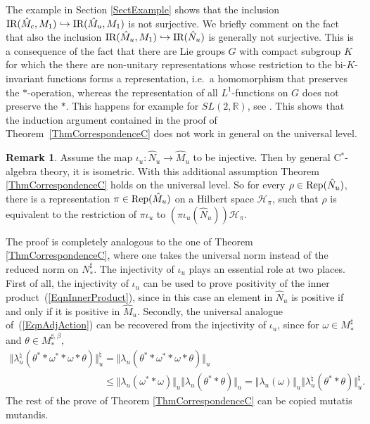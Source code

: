 \documentclass[pdftex]{sigma}
\numberwithin{equation}{section}
\theoremstyle{definition}
\newtheorem{rmk}[thm]{Remark}
\newcommand{\Rep}{\text{\rm Rep}}
\newcommand{\cHil}{\mathcal{H}}
\newcommand{\IR}{\text{\rm IR}}
\begin{document}
The example in Section \ref{SectExample} shows that the inclusion $\IR(\hat{M}_c, M_1) \hookrightarrow \IR(\hat{M}_u, M_1)$ is not surjective. We brief\/ly comment on the fact that also the inclusion $\IR(\hat{M}_u, M_1) \hookrightarrow \IR(\hat{N}_u)$ is generally not surjective. This is a consequence of the fact that there are Lie groups $G$ with compact subgroup $K$ for which the there are non-unitary representations whose restriction to the bi-$K$-invariant functions forms a representation, i.e.\ a homomorphism that preserves the $\ast$-operation, whereas the representation of all $L^1$-functions on $G$ does not preserve the $\ast$. This happens for example for $SL(2, \mathbb{R})$, see \cite[Example~1.1.2 on p.~37 and p.~40]{Vog}.
 This shows that the induction argument contained in the proof of Theorem~\ref{ThmCorrespondenceC} does not work in general on the universal level.

\begin{rmk}\label{RmkIotaUIsNotInjective}
Assume the map $\iota_u: \hat{N}_u \rightarrow \hat{M}_u$ to be injective. Then by general C$^\ast$-algebra theory, it is isometric. With this additional assumption Theorem \ref{ThmCorrespondenceC} holds on the universal level. So for every $\rho \in \Rep(\hat{N}_u)$, there is a representation $\pi \in \Rep(\hat{M}_u)$ on a Hilbert space $\cHil_\pi$, such that $\rho$ is equivalent to the restriction of $\pi \iota_u$ to $(\pi \iota_u(\hat{N}_u))\cHil_\pi$.

The proof is completely analogous to the one of Theorem \ref{ThmCorrespondenceC}, where one takes the universal norm instead of the reduced norm on $N_\ast^\sharp$. The injectivity of $\iota_u$ plays an essential role at two places. First of all, the injectivity of $\iota_u$ can be used to prove positivity of the inner product~(\ref{EqnInnerProduct}), since in this case an element in $\hat{N}_u$ is positive if and only if it is positive in $\hat{M}_u$. Secondly, the universal analogue of~(\ref{EqnAdjAction}) can be recovered from the injectivity of $\iota_u$, since for $\omega \in M_\ast^\sharp$ and $\theta \in M_\ast^{\sharp, \beta}$,
\begin{gather*}
 \Vert \lambda_u^\natural (\theta^\ast \ast \omega^\ast \ast \omega \ast \theta) \Vert_u^\natural
 = \Vert \lambda_u (\theta^\ast \ast \omega^\ast \ast \omega \ast \theta) \Vert_u \\
\phantom{\Vert \lambda_u^\natural (\theta^\ast \ast \omega^\ast \ast \omega \ast \theta) \Vert_u^\natural}{}
 \leq   \Vert  \lambda_u(\omega^\ast \ast \omega) \Vert_u  \Vert \lambda_u (\theta^\ast  \ast \theta) \Vert_u
  = \Vert \lambda_u(\omega) \Vert_u \Vert \lambda_u^\natural (\theta^\ast  \ast \theta) \Vert_u^\natural.
\end{gather*}
The rest of the prove of Theorem \ref{ThmCorrespondenceC} can be copied mutatis mutandis.
\end{rmk}
\end{document}
